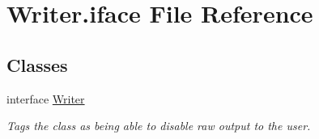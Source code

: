 \hypertarget{Writer_8iface}{\section{Writer.\-iface File Reference}
\label{Writer_8iface}
}
\subsection*{Classes}
\begin{DoxyCompactItemize}
\item 
interface \hyperlink{interfaceWriter}{Writer}
\begin{DoxyCompactList}\small\item\em Tags the class as being able to disable raw output to the user. \end{DoxyCompactList}\end{DoxyCompactItemize}

